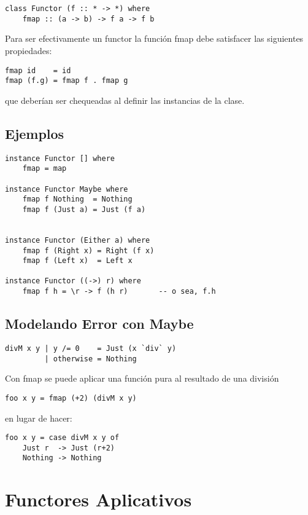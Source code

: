 \documentclass{article}
\begin{document}
\begin{lstlisting}
class Functor (f :: * -> *) where
    fmap :: (a -> b) -> f a -> f b
\end{lstlisting}

Para ser efectivamente un functor la función fmap debe satisfacer las siguientes propiedades:

\begin{lstlisting}
fmap id    = id
fmap (f.g) = fmap f . fmap g
\end{lstlisting}
que deberían ser chequeadas al definir las instancias de la clase.

\subsection{Ejemplos}

\begin{lstlisting}
instance Functor [] where
    fmap = map

instance Functor Maybe where
    fmap f Nothing  = Nothing
    fmap f (Just a) = Just (f a)
    
    
instance Functor (Either a) where
    fmap f (Right x) = Right (f x)
    fmap f (Left x)  = Left x
    
instance Functor ((->) r) where
    fmap f h = \r -> f (h r)       -- o sea, f.h
\end{lstlisting}

\subsection{Modelando Error con Maybe}\label{subsec:modelando_error_con_maybe}

\begin{lstlisting}
divM x y | y /= 0    = Just (x `div` y)
         | otherwise = Nothing
\end{lstlisting}

Con fmap se puede aplicar una función pura al resultado de una división

\begin{lstlisting}
foo x y = fmap (+2) (divM x y)
\end{lstlisting}

en lugar de hacer:

\begin{lstlisting}
foo x y = case divM x y of
    Just r  -> Just (r+2)
    Nothing -> Nothing
\end{lstlisting}

\section{Functores Aplicativos}\label{sec:functores_aplicativos}
\end{document}
